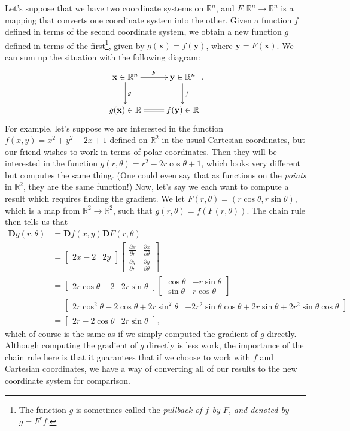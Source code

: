 \documentclass[12pt,letterpaper]{article}
\newcommand{\R}{\mathbb{R}}
\newcommand{\D}{\mathbf{D}}
\newcommand{\x}{\mathbf{x}}
\newcommand{\y}{\mathbf{y}}
\begin{document}
Let's suppose that we have two coordinate systems on $\R^n$, and $F:\R^n\to \R^n$ is a mapping that converts one coordinate system into the other. Given a function $f$ defined in terms of the second coordinate system, we obtain a new function $g$ defined in terms of the first\footnote{The function $g$ is sometimes called the {\em pullback of $f$ by $F$, and denoted by $g=F^*f$}.}, given by $g(\x) = f(\y)$, where $\y = F(\x)$. We can sum up the situation with the following diagram:
\[
 \xymatrix{\x\in \R^n \ar[r]^F \ar[d]^g & \y\in\R^n \ar[d]^f\\ g(\x)\in\R \ar@{=}[r]& f(\y)\in\R}. 
\]
For example, let's suppose we are interested in the function $f(x,y) = x^2+y^2-2x+1$ defined on $\R^2$ in the usual Cartesian coordinates, but our friend wishes to work in terms of polar coordinates. Then they will be interested in the function $g(r,\theta) = r^2-2r\cos\theta+1$, which looks very different but computes the same thing. (One could even say that as functions on the {\em points} in $\R^2$, they are the same function!) Now, let's say we each want to compute a result which requires finding the gradient. We let $F(r,\theta) = (r\cos\theta, r\sin\theta)$, which is a map from $\R^2\to \R^2$, such that $g(r,\theta) = f(F(r,\theta))$. The chain rule then tells us that
\begin{align*}
 \D g(r,\theta) &= \D f(x,y)\D F(r,\theta)\\
& = \begin{bmatrix}
     2x-2 & 2y
    \end{bmatrix}\begin{bmatrix}
		  \frac{\partial x}{\partial r} & \frac{\partial x}{\partial \theta}\\
		  \frac{\partial y}{\partial r} & \frac{\partial y}{\partial \theta}
		 \end{bmatrix}\\
& = \begin{bmatrix}
     2r\cos\theta-2 & 2r\sin\theta
    \end{bmatrix}\begin{bmatrix}
		  \cos\theta & -r\sin\theta \\
		  \sin\theta & r\cos\theta
		 \end{bmatrix}\\
& = \begin{bmatrix}2r\cos^2\theta-2\cos\theta+2r\sin^2\theta & -2r^2\sin\theta\cos\theta+2r\sin\theta+2r^2\sin\theta\cos\theta\end{bmatrix}\\
& = \begin{bmatrix}2r-2\cos\theta & 2r\sin\theta\end{bmatrix},
\end{align*}
which of course is the same as if we simply computed the gradient of $g$ directly. Although computing the gradient of $g$ directly is less work, the importance of the chain rule here is that it guarantees that if we choose to work with $f$ and Cartesian coordinates, we have a way of converting all of our results to the new coordinate system for comparison.
\end{document}
